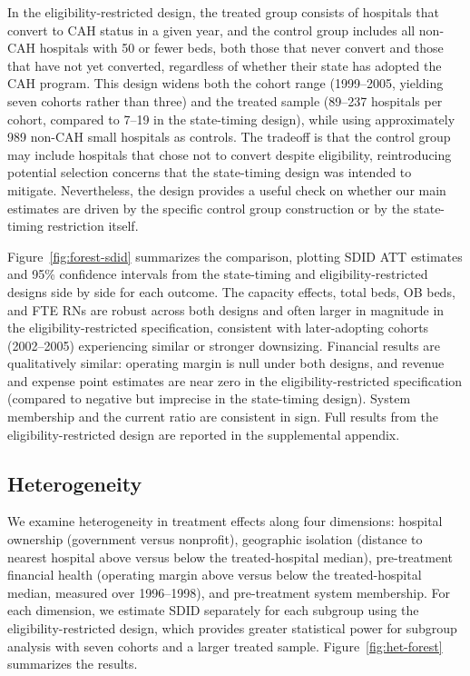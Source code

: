 \documentclass[a4paper, 12pt, twoside]{article}
\begin{document}
In the eligibility-restricted design, the treated group consists of hospitals that convert to CAH status in a given year, and the control group includes all non-CAH hospitals with 50 or fewer beds, both those that never convert and those that have not yet converted, regardless of whether their state has adopted the CAH program. This design widens both the cohort range (1999--2005, yielding seven cohorts rather than three) and the treated sample (89--237 hospitals per cohort, compared to 7--19 in the state-timing design), while using approximately 989 non-CAH small hospitals as controls. The tradeoff is that the control group may include hospitals that chose not to convert despite eligibility, reintroducing potential selection concerns that the state-timing design was intended to mitigate. Nevertheless, the design provides a useful check on whether our main estimates are driven by the specific control group construction or by the state-timing restriction itself.

Figure~\ref{fig:forest-sdid} summarizes the comparison, plotting SDID ATT estimates and 95\% confidence intervals from the state-timing and eligibility-restricted designs side by side for each outcome. The capacity effects, total beds, OB beds, and FTE RNs are robust across both designs and often larger in magnitude in the eligibility-restricted specification, consistent with later-adopting cohorts (2002--2005) experiencing similar or stronger downsizing. Financial results are qualitatively similar: operating margin is null under both designs, and revenue and expense point estimates are near zero in the eligibility-restricted specification (compared to negative but imprecise in the state-timing design). System membership and the current ratio are consistent in sign. Full results from the eligibility-restricted design are reported in the supplemental appendix.


\subsection{Heterogeneity}
\label{sec:heterogeneity}

We examine heterogeneity in treatment effects along four dimensions: hospital ownership (government versus nonprofit), geographic isolation (distance to nearest hospital above versus below the treated-hospital median), pre-treatment financial health (operating margin above versus below the treated-hospital median, measured over 1996--1998), and pre-treatment system membership. For each dimension, we estimate SDID separately for each subgroup using the eligibility-restricted design, which provides greater statistical power for subgroup analysis with seven cohorts and a larger treated sample. Figure~\ref{fig:het-forest} summarizes the results.
\end{document}
